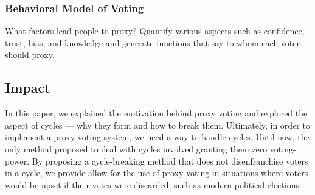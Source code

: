 \documentclass[10pt]{article}
\theoremstyle{definition}
\begin{document}
\subsubsection{Behavioral Model of Voting}

What factors lead people to proxy? Quantify various aspects such as confidence, trust, bias, and knowledge and generate functions that say to whom each voter should proxy.

\subsection{Impact}
In this paper, we explained the motivation behind proxy voting and explored the aspect of cycles --- why they form and how to break them. Ultimately, in order to implement a proxy voting system, we need a way to handle cycles. Until now, the only method proposed to deal with cycles involved granting them zero voting-power. By proposing a cycle-breaking method that does not disenfranchise voters in a cycle, we provide allow for the use of proxy voting in situations where voters would be upset if their votes were discarded, such as modern political elections.
\end{document}
